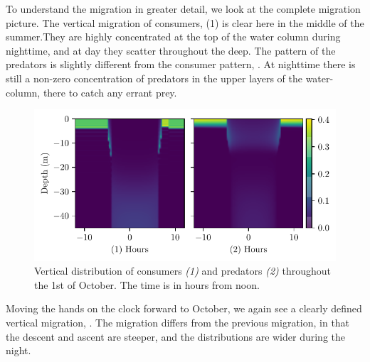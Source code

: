 To understand the migration in greater detail, we look at the complete migration picture.
The vertical migration of consumers, (1) is clear here in the middle of the summer.They are highly concentrated at the top of the water column during nighttime, and at day they scatter throughout the deep. The pattern of the predators is slightly different from the consumer pattern, . At nighttime there is still a non-zero concentration of predators in the upper layers of the water-column, there to catch any errant prey.
\begin{figure}[H]
\includegraphics{plots/heatmapsday180_nonrandom.pdf}
\caption{Vertical distribution of consumers \emph{(1)} and predators \emph{(2)} throughout the 1st of October. The time is in hours from noon.}
\label{fig:heatmaps_180_nonrandom}
\end{figure}
Moving the hands on the clock forward to October, we again see a clearly defined vertical migration, . The migration differs from the previous migration, in that the descent and ascent are steeper, and the distributions are wider during the night.
